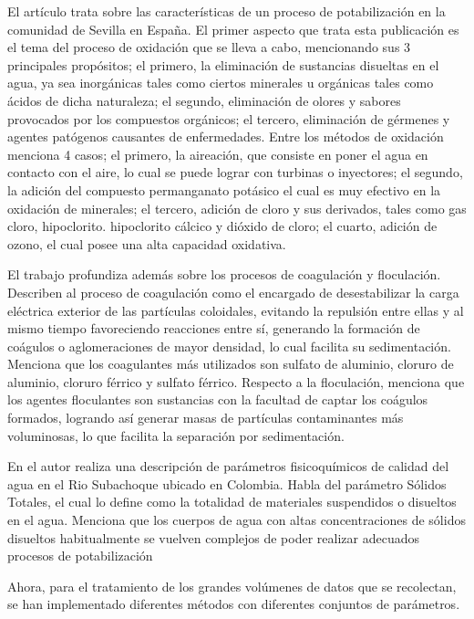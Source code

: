 El artículo \cite{paper02_TAR_Sevilla} trata sobre las características de un proceso de potabilización en la comunidad de Sevilla en España. El primer aspecto que trata esta publicación es el tema del proceso de oxidación 
que se lleva a cabo, mencionando sus 3 principales propósitos; el primero, la eliminación de sustancias disueltas en el agua, ya sea inorgánicas tales como ciertos minerales u orgánicas tales como ácidos de dicha naturaleza;
el segundo, eliminación de olores y sabores provocados por los compuestos orgánicos; el tercero, eliminación de gérmenes y agentes patógenos causantes de enfermedades. Entre los métodos de oxidación menciona 
4 casos; el primero, la aireación, que consiste en poner el agua en contacto con el aire, lo cual se puede lograr con turbinas o inyectores; el segundo, la adición del compuesto permanganato potásico el cual es muy 
efectivo en la oxidación de minerales; el tercero, adición de cloro y sus derivados, tales como gas cloro, hipoclorito. hipoclorito cálcico y dióxido de 
cloro; el cuarto, adición de ozono, el cual posee una alta capacidad oxidativa.

El trabajo \cite{paper02_TAR_Sevilla} profundiza además sobre los procesos de coagulación y floculación. Describen al proceso de coagulación como el encargado de desestabilizar la carga eléctrica exterior de las partículas 
coloidales, evitando la repulsión entre ellas y al mismo tiempo favoreciendo reacciones entre sí, generando la formación de coágulos o aglomeraciones de mayor densidad, lo cual facilita su sedimentación. Menciona 
que los coagulantes más utilizados son sulfato de aluminio, cloruro de aluminio, cloruro férrico y sulfato férrico. Respecto a la floculación, menciona que los 
agentes floculantes son sustancias con la facultad de captar los coágulos formados, logrando así generar masas de partículas contaminantes más voluminosas, lo que facilita la separación por sedimentación.

En \cite{evaluacionSubachoque} el autor realiza una descripción de parámetros fisicoquímicos de calidad del agua en el Rio Subachoque ubicado en Colombia. Habla del parámetro Sólidos Totales, el cual lo define como la totalidad
de materiales suspendidos o disueltos en el agua. Menciona que los cuerpos de agua con altas concentraciones de sólidos disueltos habitualmente se vuelven complejos de poder realizar adecuados procesos de potabilización

Ahora, para el tratamiento de los grandes volúmenes de datos que se recolectan, se 
han implementado diferentes métodos con diferentes conjuntos de parámetros.

